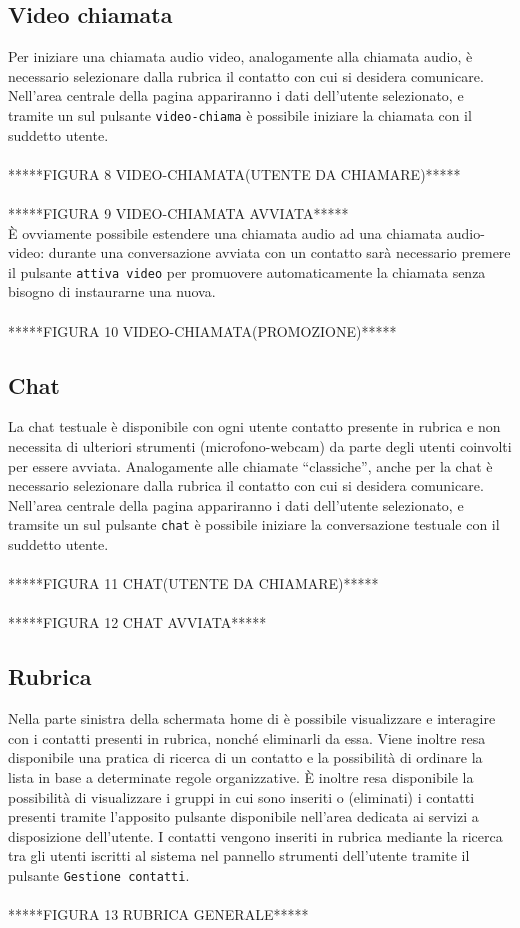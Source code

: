 \subsection{Video chiamata}
Per iniziare una chiamata audio video, analogamente alla chiamata audio, è necessario selezionare dalla rubrica il contatto con cui si desidera comunicare. Nell'area centrale della pagina appariranno i dati dell'utente selezionato, e tramite un  sul pulsante 
\texttt{video-chiama} è possibile iniziare la chiamata con il suddetto utente.
\\\\*****FIGURA 8 VIDEO-CHIAMATA(UTENTE DA CHIAMARE)*****
\\\\*****FIGURA 9 VIDEO-CHIAMATA AVVIATA*****
\\È ovviamente possibile estendere una chiamata audio ad una chiamata audio-video: durante una conversazione avviata con un contatto sarà necessario premere il pulsante \texttt{attiva video} per promuovere automaticamente la chiamata senza bisogno di instaurarne una nuova.
\\\\*****FIGURA 10 VIDEO-CHIAMATA(PROMOZIONE)*****
\subsection{Chat}
La chat testuale è disponibile con ogni utente contatto presente in rubrica e non necessita di ulteriori strumenti (microfono-webcam) da parte degli utenti coinvolti per essere avviata. Analogamente alle chiamate ``classiche'', anche per la chat è necessario selezionare dalla rubrica il contatto con cui si desidera comunicare. Nell'area centrale della pagina appariranno i dati dell'utente selezionato, e tramsite un  sul pulsante \texttt{chat} è possibile iniziare la conversazione testuale con il suddetto utente.
\\\\*****FIGURA 11 CHAT(UTENTE DA CHIAMARE)*****
\\\\*****FIGURA 12 CHAT AVVIATA*****
\subsection{Rubrica}
Nella parte sinistra della schermata home di \caName{} è possibile visualizzare e interagire con i contatti presenti in rubrica, nonché eliminarli da essa. 
Viene inoltre resa disponibile una pratica  di ricerca di un contatto e la possibilità di ordinare la lista in base a determinate regole organizzative. È inoltre resa disponibile la possibilità di visualizzare i gruppi in cui sono inseriti o (eliminati) i contatti presenti tramite l'apposito pulsante disponibile nell'area dedicata ai servizi a disposizione dell'utente.
I contatti vengono inseriti in rubrica mediante la ricerca tra gli utenti iscritti al sistema nel pannello strumenti dell'utente tramite il pulsante \texttt{Gestione contatti}.
\\\\*****FIGURA 13 RUBRICA GENERALE*****
